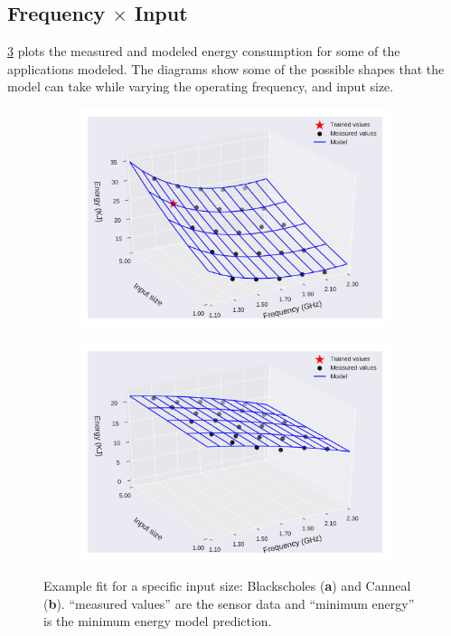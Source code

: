 \subsection{Frequency $\times$ Input} \label{subsec:mvme_frequency_x_input}
\cref{fig:en_eq_freq_inp_fi} plots the measured and modeled energy consumption for some of the applications modeled. The diagrams show some of the possible shapes that the model can take while varying the operating frequency, and input size.
\begin{figure}[H]
	\centering
	\captionsetup[subfigure]{justification=centering}
	\begin{subfigure}[b]{0.45\textwidth}
		\centerline{\includegraphics[width=\columnwidth]{models/figures/energy/freq_inps/completo_black_5.pdf}}
		\caption{}
		\label{fig:en_eq_black_fi}
	\end{subfigure}
	\begin{subfigure}[b]{0.45\textwidth}
		\centerline{\includegraphics[width=\columnwidth]{models/figures/energy/freq_inps/completo_canneal_1.pdf}}
		\caption{}
		\label{fig:en_eq_canneal_fi}
	\end{subfigure}
	
	\caption{Example fit for a specific input size: Blackscholes (\textbf{a}) and Canneal (\textbf{b}).  “measured values” are the sensor data and “minimum energy” is the minimum energy model prediction.
	}
	\label{fig:en_eq_freq_inp_fi}
\end{figure}

